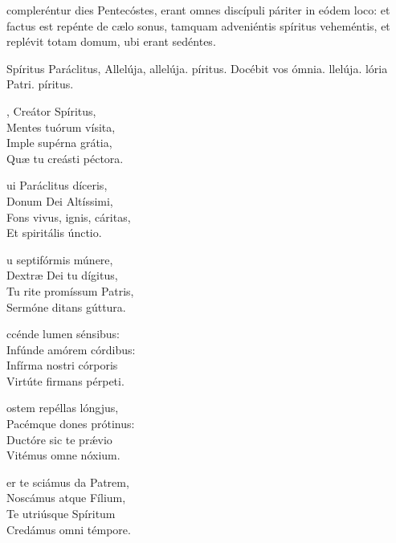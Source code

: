 \documentclass[fontsize=9pt,paper=A6,twoside,BCOR=1mm,DIV=22,headinclude]{scrarticle}
\begin{document}
\begin{multicols}{2}


 compleréntur dies Pentecóstes, erant omnes discípuli páriter in eódem loco: et factus est repénte de cælo sonus, tamquam adveniéntis spíritus veheméntis, et replévit totam domum, ubi erant sedéntes.

\Rbr Spíritus Paráclitus, \red{*} Allelúja, allelúja.
píritus.
\V Docébit vos ómnia.
llelúja.
lória Patri.
píritus.


\begin{hymnus}
	, Creátor Spíritus,\\
	\hspace{1.6em} Mentes tuórum vísita,\\
Imple supérna grátia,\\
Quæ tu creásti péctora.

ui Paráclitus díceris,\\
Donum Dei Altíssimi,\\
Fons vivus, ignis, cáritas,\\
Et spiritális únctio.

u septifórmis múnere,\\
Dextræ Dei tu dígitus,\\
Tu rite promíssum Patris,\\
Sermóne ditans gúttura.

ccénde lumen sénsibus:\\
Infúnde amórem córdibus:\\
Infírma nostri córporis\\
Virtúte firmans pérpeti.

ostem repéllas lóngjus,\\
Pacémque dones prótinus:\\
Ductóre sic te prǽvio\\
Vitémus omne nóxium.

er te sciámus da Patrem,\\
Noscámus atque Fílium,\\
Te utriúsque Spíritum\\
Credámus omni témpore.


\end{hymnus}
\end{multicols}
\end{document}
